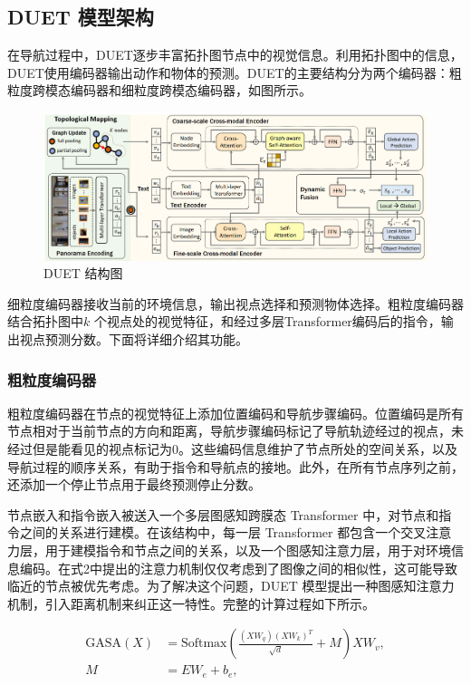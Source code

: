 \documentclass[bachelor]{thesis-uestc}
\begin{document}
\subsection{DUET 模型架构}

在导航过程中，DUET逐步丰富拓扑图节点中的视觉信息。利用拓扑图中的信息，DUET使用编码器输出动作和物体的预测。DUET的主要结构分为两个编码器：粗粒度跨模态编码器和细粒度跨模态编码器，如图所示。

\begin {figure}[h]
\centering %
\includegraphics[width=\textwidth]{0242-042816.png}
\caption{DUET 结构图} %
\label{duet}
\end {figure}

细粒度编码器接收当前的环境信息，输出视点选择和预测物体选择。粗粒度编码器结合拓扑图中$k$ 个视点处的视觉特征，和经过多层Transformer编码后的指令，输出视点预测分数。下面将详细介绍其功能。

\subsubsection{粗粒度编码器}

粗粒度编码器在节点的视觉特征上添加位置编码和导航步骤编码。位置编码是所有节点相对于当前节点的方向和距离，导航步骤编码标记了导航轨迹经过的视点，未经过但是能看见的视点标记为0。这些编码信息维护了节点所处的空间关系，以及导航过程的顺序关系，有助于指令和导航点的接地。此外，在所有节点序列之前，还添加一个停止节点用于最终预测停止分数。

节点嵌入和指令嵌入被送入一个多层图感知跨膜态 Transformer 中，对节点和指令之间的关系进行建模。在该结构中，每一层 Transformer 都包含一个交叉注意力层，用于建模指令和节点之间的关系，以及一个图感知注意力层，用于对环境信息编码。在式2中提出的注意力机制仅仅考虑到了图像之间的相似性，这可能导致临近的节点被优先考虑。为了解决这个问题，DUET 模型提出一种图感知注意力机制，引入距离机制来纠正这一特性。完整的计算过程如下所示。

\begin{equation}
    \begin{aligned}
        \text{GASA}(X) &= \text{Softmax} \left( \frac{(XW_{q})(XW_{k})^{T}}{\sqrt{d}} + M \right) XW_{v}, \\
        M &= EW_{e} + b_{e},
    \end{aligned}
\label{GASA}
\end{equation}
\end{document}
